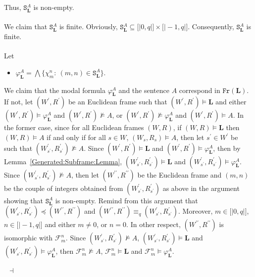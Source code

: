 \documentclass[draft]{article}
\newenvironment{proof}{{\bf Proof:}}{~$\dashv$\\}
\def\lsem{{\lbrack\mid}}
\def\rsem{{\mid\rbrack}}
\def\Fr{\mathtt{Fr}}
\def\L{\mathbf{L}}
\begin{document}
\begin{proof}
%
%
Thus, $\mathtt{S}_{\L}^{A}$ is non-empty.
%
%
\\
\\
%
%
We claim that $\mathtt{S}_{\L}^{A}$ is finite.
Obviously, $\mathtt{S}_{\L}^{A}{\subseteq}\lsem0,q\rsem{\times}\lsem{-}1,q\rsem$.
Consequently, $\mathtt{S}_{\L}^{A}$ is finite.
%
%
\\
\\
%
%
Let
%
%
\begin{itemize}
%
%
\item $\varphi_{\L}^{A}{=}\bigwedge\{\chi_{m}^{n}:\ (m,n){\in}\mathtt{S}_{\L}^{A}\}$.
%
%
\end{itemize}
%
%
%
%
We claim that the modal formula $\varphi_{\L}^{A}$ and the sentence $A$ correspond in $\Fr(\L)$.
If not, let $(W^{\prime},R^{\prime})$ be an Euclidean frame such that $(W^{\prime},R^{\prime}){\models}\L$ and either $(W^{\prime},R^{\prime}){\models}\varphi_{\L}^{A}$ and $(W^{\prime},R^{\prime}){\not\models}A$, or $(W^{\prime},R^{\prime}){\not\models}\varphi_{\L}^{A}$ and $(W^{\prime},R^{\prime}){\models}A$.
In the former case, since for all Euclidean frames $(W,R)$, if $(W,R){\models}\L$ then $(W,R){\models}A$ if and only if for all $s{\in}W$, $(W_{s},R_{s}){\models}A$, then let $s^{\prime}{\in}W^{\prime}$ be such that $(W^{\prime}_{s^{\prime}},R^{\prime}_{s^{\prime}}){\not\models}A$.
Since $(W^{\prime},R^{\prime}){\models}\L$ and $(W^{\prime},R^{\prime}){\models}\varphi_{\L}^{A}$, then by Lemma~\ref{Generated:Subframe:Lemma}, $(W^{\prime}_{s^{\prime}},R^{\prime}_{s^{\prime}}){\models}\L$ and $(W^{\prime}_{s^{\prime}},R^{\prime}_{s^{\prime}}){\models}\varphi_{\L}^{A}$.
Since $(W^{\prime}_{s^{\prime}},R^{\prime}_{s^{\prime}}){\not\models}A$, then let $(W^{\prime\prime},R^{\prime\prime})$ be the Euclidean frame and $(m,n)$ be the couple of integers obtained from $(W^{\prime}_{s^{\prime}},R^{\prime}_{s^{\prime}})$ as above in the argument showing that $\mathtt{S}_{\L}^{A}$ is non-empty.
Remind from this argument that $(W^{\prime}_{s^{\prime}},R^{\prime}_{s^{\prime}}){\preceq}(W^{\prime\prime},R^{\prime\prime})$ and $(W^{\prime\prime},R^{\prime\prime}){\equiv_{q}}(W^{\prime}_{s^{\prime}},R^{\prime}_{s^{\prime}})$.
Moreover, $m{\in}\lsem0,q\rsem$, $n{\in}\lsem{-}1,q\rsem$ and either $m{\not=}0$, or $n{=}0$.
In other respect, $(W^{\prime\prime},R^{\prime\prime})$ is isomorphic with ${\mathcal F}_{m}^{n}$.
Since $(W^{\prime}_{s^{\prime}},R^{\prime}_{s^{\prime}}){\not\models}A$, $(W^{\prime}_{s^{\prime}},R^{\prime}_{s^{\prime}}){\models}\L$ and $(W^{\prime}_{s^{\prime}},R^{\prime}_{s^{\prime}}){\models}\varphi_{\L}^{A}$, then ${\mathcal F}_{m}^{n}{\not\models}A$, ${\mathcal F}_{m}^{n}{\models}\L$ and ${\mathcal F}_{m}^{n}{\models}\varphi_{\L}^{A}$.

\end{proof}
\end{document}
